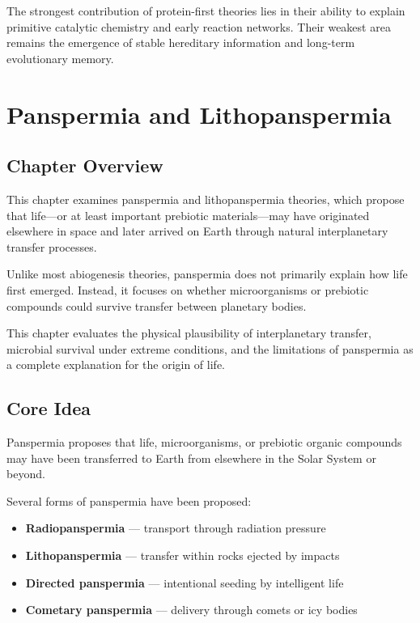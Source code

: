 \documentclass[
  oneside]{book}
\providecommand{\tightlist}{%
  \setlength{\itemsep}{0pt}\setlength{\parskip}{0pt}}
\begin{document}
The strongest contribution of protein-first theories lies in their ability to explain primitive catalytic chemistry and early reaction networks. Their weakest area remains the emergence of stable hereditary information and long-term evolutionary memory.

\chapter{Panspermia and Lithopanspermia}\label{panspermia-and-lithopanspermia}

\section{Chapter Overview}\label{chapter-overview-7}

This chapter examines panspermia and lithopanspermia theories, which propose that life---or at least important prebiotic materials---may have originated elsewhere in space and later arrived on Earth through natural interplanetary transfer processes.

Unlike most abiogenesis theories, panspermia does not primarily explain how life first emerged. Instead, it focuses on whether microorganisms or prebiotic compounds could survive transfer between planetary bodies.

This chapter evaluates the physical plausibility of interplanetary transfer, microbial survival under extreme conditions, and the limitations of panspermia as a complete explanation for the origin of life.

\section{Core Idea}\label{core-idea-7}

Panspermia proposes that life, microorganisms, or prebiotic organic compounds may have been transferred to Earth from elsewhere in the Solar System or beyond.

Several forms of panspermia have been proposed:

\begin{itemize}
\tightlist
\item
  \textbf{Radiopanspermia} --- transport through radiation pressure
\item
  \textbf{Lithopanspermia} --- transfer within rocks ejected by impacts
\item
  \textbf{Directed panspermia} --- intentional seeding by intelligent life
\item
  \textbf{Cometary panspermia} --- delivery through comets or icy bodies
\end{itemize}
\end{document}
